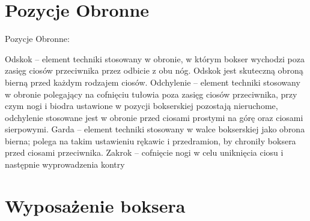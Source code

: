 \documentclass[14pt,oneside,a4paper]{book}
\theoremstyle{break}
\begin{document}
\section {Pozycje Obronne}

Pozycje Obronne:

Odskok – element techniki stosowany w obronie, w którym bokser wychodzi poza zasięg ciosów przeciwnika przez odbicie z obu nóg. Odskok jest skuteczną obroną bierną przed każdym rodzajem ciosów.
Odchylenie – element techniki stosowany w obronie polegający na cofnięciu tułowia poza zasięg ciosów przeciwnika, przy czym nogi i biodra ustawione w pozycji bokserskiej pozostają nieruchome, odchylenie stosowane jest w obronie przed ciosami prostymi na górę oraz ciosami sierpowymi.
Garda – element techniki stosowany w walce bokserskiej jako obrona bierna; polega na takim ustawieniu rękawic i przedramion, by chroniły boksera przed ciosami przeciwnika.
Zakrok – cofnięcie nogi w celu uniknięcia ciosu i następnie wyprowadzenia kontry

\section {Wyposażenie boksera}
\end{document}

